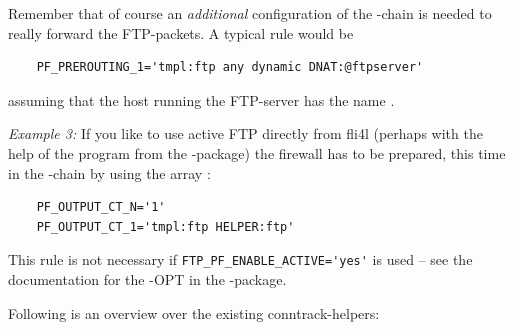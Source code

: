   Remember that of course an \emph{additional} configuration of the
  -chain is needed to really forward the FTP-packets. 
  A typical rule would be
  
\begin{example}
\begin{verbatim}
    PF_PREROUTING_1='tmpl:ftp any dynamic DNAT:@ftpserver'
\end{verbatim}
\end{example}

  assuming that the host running the FTP-server has the name .

  \emph{Example 3:} If you like to use active FTP directly from fli4l (perhaps with 
  the help of the  program from the -package) the firewall
  has to be prepared, this time in the -chain by using 
  the array :

\begin{example}
\begin{verbatim}
    PF_OUTPUT_CT_N='1'
    PF_OUTPUT_CT_1='tmpl:ftp HELPER:ftp'
\end{verbatim}
\end{example}

  This rule is not necessary if \verb+FTP_PF_ENABLE_ACTIVE='yes'+
  is used -- see the documentation for the -OPT in
  the -package.

  Following is an overview over the existing conntrack-helpers:

